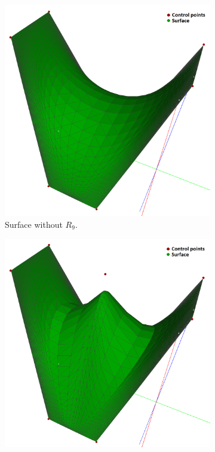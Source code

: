 \documentclass{article}
\begin{document}
\begin{figure}[H]
\centering
\begin{subfigure}[b]{0.32\textwidth}
\includegraphics[width=\textwidth]{saddle4a}
\caption{Surface without $R_9$.}
\label{saddle4a}
\end{subfigure}
\begin{subfigure}[b]{0.32\textwidth}
\includegraphics[width=\textwidth]{saddle4b}

\end{subfigure}
\end{figure}
\end{document}
